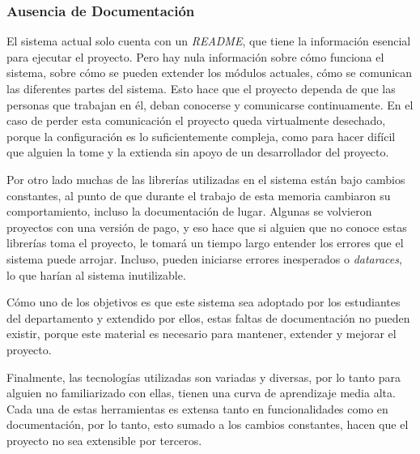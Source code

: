         \subsubsection{Ausencia de Documentación}
            \par El sistema actual solo cuenta con un \textit{README}, que tiene la información esencial para ejecutar el proyecto. Pero hay nula información sobre cómo funciona el sistema, sobre cómo se pueden extender los módulos actuales, cómo se comunican las diferentes partes del sistema. Esto hace que el proyecto dependa de que las personas que trabajan en él, deban conocerse y comunicarse continuamente. En el caso de perder esta comunicación el proyecto queda virtualmente desechado, porque la configuración es lo suficientemente compleja, como para hacer difícil que alguien la tome y la extienda sin apoyo de un desarrollador del proyecto. 
            \par Por otro lado muchas de las librerías utilizadas en el sistema están bajo cambios constantes, al punto de que durante el trabajo de esta memoria cambiaron su comportamiento, incluso la documentación de lugar. Algunas se volvieron proyectos con una versión de pago, y eso hace que si alguien que no conoce estas librerías toma el proyecto, le tomará un tiempo largo entender los errores que el sistema puede arrojar. Incluso, pueden iniciarse errores inesperados o \textit{dataraces}, lo que harían al sistema inutilizable. 
            \par Cómo uno de los objetivos es que este sistema sea adoptado por los estudiantes del departamento y extendido por ellos, estas faltas de documentación no pueden existir, porque este material es necesario para mantener, extender y mejorar el proyecto.
            \par Finalmente, las tecnologías utilizadas son variadas y diversas, por lo tanto para alguien no familiarizado con ellas, tienen una curva de aprendizaje media alta. Cada una de estas herramientas es extensa tanto en funcionalidades como en documentación, por lo tanto, esto sumado a los cambios constantes, hacen que el proyecto no sea extensible por terceros.

